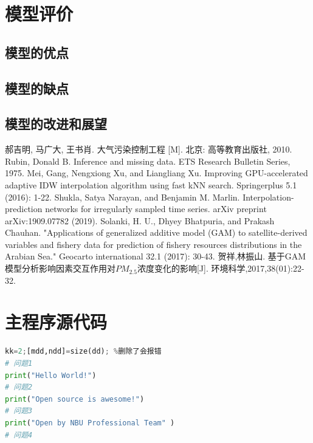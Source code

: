 \documentclass[a4paper,10pt]{my_paper}
\numberwithin{equation}{section}
\begin{document}
\section{模型评价}

\subsection{模型的优点}

\subsection{模型的缺点}

\subsection{模型的改进和展望}

\begin{thebibliography}{10}
郝吉明, 马广大, 王书肖. 大气污染控制工程 [M]. 北京: 高等教育出版社, 2010.
Rubin, Donald B. Inference and missing data. ETS Research Bulletin Series, 1975.
Mei, Gang, Nengxiong Xu, and Liangliang Xu. Improving GPU-accelerated adaptive IDW interpolation algorithm using fast kNN search. Springerplus 5.1 (2016): 1-22.
Shukla, Satya Narayan, and Benjamin M. Marlin. Interpolation-prediction networks for irregularly sampled time series. arXiv preprint arXiv:1909.07782 (2019).
Solanki, H. U., Dhyey Bhatpuria, and Prakash Chauhan. "Applications of generalized additive model (GAM) to satellite-derived variables and fishery data for prediction of fishery resources distributions in the Arabian Sea." Geocarto international 32.1 (2017): 30-43.
贺祥,林振山. 基于GAM模型分析影响因素交互作用对${PM_{2.5}}$浓度变化的影响[J]. 环境科学,2017,38(01):22-32.
\end{thebibliography}

\newpage

\appendix

\section{主程序源代码}

\begin{lstlisting}[language=Python]%设置不同语言即可。
kk=2;[mdd,ndd]=size(dd); %删除了会报错
# 问题1
print("Hello World!")
# 问题2
print("Open source is awesome!")
# 问题3
print("Open by NBU Professional Team" )
# 问题4

\end{lstlisting}
\end{document}
